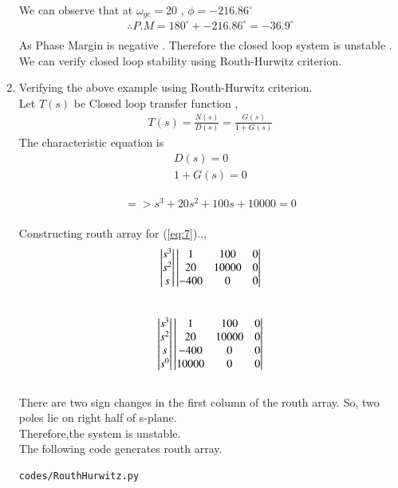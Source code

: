 \begin{enumerate}[label=\thesection.\arabic*.,ref=\thesection.\theenumi]
\begin{figure}[!h]
  \caption{}
  \label{fig:ee18btech11017_1}
\end{figure}
We can observe that at $\omega_{gc}=20$ , $\phi=-216.86^{\circ}$
\\
\begin{align}
\therefore P.M=180^{\circ}+-216.86^{\circ}=-36.9^{\circ} \\
\end{align}
As Phase Margin is negative . Therefore the closed loop system is unstable .
We can verify closed loop stability using Routh-Hurwitz criterion.


\item
Verifying the above example using Routh-Hurwitz criterion.\\
Let $T(s)$ be Closed loop transfer function ,
\begin{align}
T(s)=\frac{N(s)}{D(s)}=\frac{G(s)}{1+G(s)}
\end{align}
The characteristic equation is 
\begin{align}
D(s)=0  \\
1+G(s)=0 
\end{align}

\begin{align}
=> s^{3}+20s^{2}+100s+10000=0   \label{eq:7} 
\end{align}
\\
Constructing routh array for (\ref{eq:7})..,
\begin{align}
\begin{vmatrix}s^3\\s^2\\s\end{vmatrix}
\begin{vmatrix}1 & 100 & 0 \\ 20 & 10000 & 0 \\ -400 & 0 & 0\end{vmatrix}
\end{align}\\

\begin{align}
\begin{vmatrix}s^3\\s^2\\s\\s^0\end{vmatrix}
\begin{vmatrix}1 & 100 & 0 \\ 20 & 10000 & 0 \\ -400 & 0 & 0 \\ 10000 & 0 & 0\end{vmatrix}
\end{align}\\

There are two sign changes in the first column of the routh array. So, two poles lie on right half of s-plane. \\
Therefore,the system is unstable.\\
The following code generates routh array.
\begin{lstlisting}
codes/RouthHurwitz.py
\end{lstlisting}























\end{enumerate}
